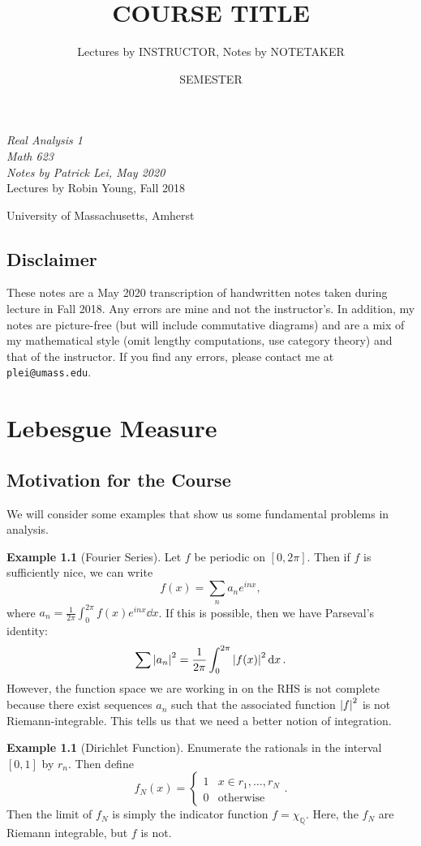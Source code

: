 \documentclass[leqno, openany]{memoir}
\title{COURSE TITLE}
\author{Lectures by INSTRUCTOR, Notes by NOTETAKER}
\date{SEMESTER}
\theoremstyle{definition}
\newtheorem{exm}[thm]{Example}
\theoremstyle{remark}
\theoremstyle{plain}
\theoremstyle{definition}
\theoremstyle{remark}
\newcommand{\Q}{\mathbb{Q}}
\newcommand*{\titleSW}
    {\begingroup%
    \raggedleft
    \vspace*{\baselineskip}
    {\Huge\itshape Real Analysis 1 \\ Math 623}\\[\baselineskip]
    {\large\itshape Notes by Patrick Lei,
                    May 2020}\\[0.2\textheight]
    {\Large Lectures by Robin Young, Fall 2018}\par
    \vfill
    {\Large \sffamily University of Massachusetts, Amherst}
    \vspace*{\baselineskip}
\endgroup}
\begin{document}
    
\begin{titlingpage}
\titleSW
\end{titlingpage}

\thispagestyle{empty}
\section*{Disclaimer}%
\label{sec:disclaimer}

These notes are a May 2020 transcription of handwritten notes taken during
lecture in Fall 2018.  Any errors are mine and not the instructor's.  In
addition, my notes are picture-free (but will include commutative diagrams) and
are a mix of my mathematical style (omit lengthy computations, use category
theory) and that of the instructor.  If you find any errors, please contact me
at \texttt{plei@umass.edu}.  \newpage



\tableofcontents

\chapter{Lebesgue Measure}%

\section{Motivation for the Course}%

We will consider some examples that show us some fundamental problems in
analysis.

\begin{exm}[Fourier Series] Let $f$ be periodic on $[0, 2\pi]$. Then if $f$ is
    sufficiently nice, we can write \[ f(x) = \sum_{n} a_n e^{inx}, \] where
    $a_n = \frac{1}{2\pi} \int_0^{2\pi} f(x) e^{inx} \dd{x}$. If this is
    possible, then we have Parseval's identity: \[ \sum \abs{a_n}^2 =
    \frac{1}{2\pi} \int_0^{2\pi} \abs{f(x)}^2 \dd{x}. \] However, the function
    space we are working in on the RHS is not complete because there exist
    sequences $a_n$ such that the associated function $\abs{f}^2$ is not
    Riemann-integrable. This tells us that we need a better notion of
    integration.  \end{exm}

\begin{exm}[Dirichlet Function] Enumerate the rationals in the interval $[0,1]$
    by $r_n$. Then define \[ f_N(x) = \begin{cases} 1 & x \in {r_1, \ldots,
    r_N} \\ 0 & \text{otherwise} \end{cases}. \] Then the limit of $f_N$ is
    simply the indicator function $f = \chi_{\Q}$. Here, the $f_N$ are Riemann
    integrable, but $f$ is not.  \end{exm}
\end{document}
